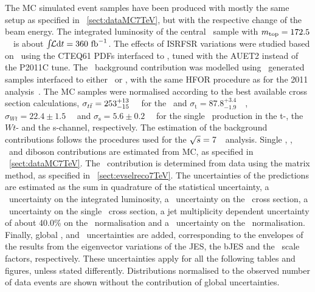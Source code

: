 The \gls{MC} simulated event samples have been produced with mostly the same setup as specified in \sect~\ref{sect:dataMC7TeV}, but with the respective change of the beam energy. The integrated luminosity of the central \ttbar\ sample with $m_{\mathrm{top}}=172.5$~\GeV\ is about $\int\!\!{\mathcal L}\mathrm{d}t=360~\mathrm{fb}^{-1}$. The effects of \gls{ISRFSR} variations were studied based on \Acermc\ using the CTEQ61 \glspl{PDF} interfaced to \Pythiasix, tuned with the AUET2 instead of the P2011C tune. The \Zj\ background contribution was modelled using \Alpgen\ generated samples interfaced to either \Pythiasix\ or \Herwig, with the same \gls{HFOR} procedure as for the 2011 analysis~\cite{TwikiHFOR}. The \gls{MC} samples were normalised according to the best available cross section calculations, $\sigma_{t\bar{t}}=253^{+13}_{-15}$~\pb~\cite{CAC-1101,PRL-109-132001,JHEP-1212,JHEP-1301,Czakon:2013goa,CZA-1101} for the \ttbar\ and  $\sigma_\mathrm{t}=87.8^{+3.4}_{-1.9}$~\pb~\cite{Kidonakis:2011wy}, $\sigma_{Wt}=22.4\pm1.5$~\pb~\cite{Kidonakis:2010ux} and $\sigma_\mathrm{s}=5.6\pm0.2$~\pb~\cite{Kidonakis:2010tc} for the single \tquark\ production in the t-, the $Wt$- and the s-channel, respectively.
%
The estimation of the background contributions follows the procedures used for the ${\sqrt{s}}=7$~\TeV\ analysis. Single \tquark, \Zj, \Wj\ and diboson contributions are estimated from \gls{MC}, as specified in \sect~\ref{sect:dataMC7TeV}. The \fake\ contribution is determined from data using the matrix method, as specified in \sect~\ref{sect:evselreco7TeV}.
%
The uncertainties of the predictions are estimated as the sum in quadrature of the statistical uncertainty, a \atlumounc\ uncertainty on the integrated luminosity, a \xsecunc\ uncertainty on the \ttbar\ cross section, a \stopxsecunc\ uncertainty on the single \tquark\ cross section, a jet multiplicity dependent uncertainty of about 40.0\% on the \Zj\ normalisation and a \qcdunc\ uncertainty on the \fake\ normalisation. Finally, global \JESunc, \bJESunc and \btagunc\ uncertainties are added, corresponding to the envelopes of the results from the eigenvector variations of the \gls{JES}, the \gls{bJES} and the \btag\ scale factors, respectively.
%
These uncertainties apply for all the following tables and figures, unless stated differently.  Distributions normalised to the observed number of data events are shown without the contribution of global uncertainties.










